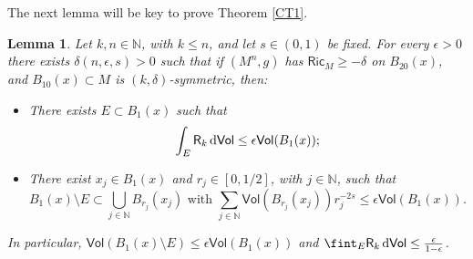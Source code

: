 \documentclass[10pt]{article}
\newtheorem{lemma}[thm]{Lemma}
\theoremstyle{definition}
\newcommand{\bb}[1]{\mathbb{#1}}
\newcommand{\ssf}[1]{\mathsf{#1}}
\newcommand{\Ric}{\mathsf{Ric}}
\newcommand{\R}{\mathsf{R}}
\newcommand{\de}{{\rm d}}
\begin{document}
The next lemma will be key to prove Theorem \ref{CT1}.



\begin{lemma} \label{L2}
    Let $k,n \in \bb{N}$, with   $k \leq n$, and let $s \in (0,1)$ be fixed. 
    For every $\epsilon >0$ there exists $\delta (n,\epsilon,s) >0$ such that if $(M^n,g)$ has $\Ric_{M} \geq - \delta$ on $B_{20}(x)$, and $B_{10}(x) \subset M$ is
     $(k,\delta)$-symmetric, then:
    \begin{itemize}
\item    There exists $E \subset B_1(x)$ such that
        \begin{equation}\label{eq:IntERk<eps}
         \int_{E} \R_k \,\de\ssf{Vol} \leq \epsilon \ssf{Vol}(B_1(x));
         \end{equation}
         \item There exist $x_j \in B_1(x)$ and $r_j \in [0,1/2]$, with  $j\in \mathbb{N}$, such that
         \begin{equation}\label{eq:B1-EBalls}
        B_1(x) \setminus E \subset \bigcup_{j \in \bb{N}} B_{r_j}(x_j) \text{ with } 
        \sum_{j \in \bb{N}} \ssf{Vol}(B_{r_j}(x_j))r_j^{-2s} \leq \epsilon \ssf{Vol}(B_1(x)).
        \end{equation}
         \end{itemize}
        In particular, $\ssf{Vol}(B_1(x) \setminus E) \leq  \epsilon \ssf{Vol}(B_1(x))$ and
        $\fint_{E} \R_k \,\de\ssf{Vol}\leq \frac{\epsilon}{1-\epsilon}$.
        \end{lemma}
\end{document}
